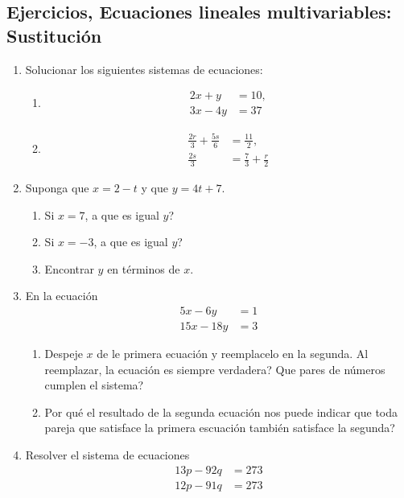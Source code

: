 \newpage
\begin{center}
	\vspace{-1cm}
	\subsection*{ Ejercicios, Ecuaciones lineales multivariables: Sustitución}\label{ejercicios:sustitucion}
\end{center}

\begin{enumerate}
	\item Solucionar los siguientes sistemas de ecuaciones:
	\begin{multicols}{2}
		\begin{enumerate}[label=\Alph*)]
			\item \begin{align*} 2x+y&=10, \\ 3x-4y &= 37\end{align*}
			\item \begin{align*} \frac{2r}{3}+\frac{5s}{6}&=\frac{11}{2}, \\ \frac{2s}{3}&= \frac{7}{3} + \frac{r}{2}\end{align*}
		\end{enumerate}
	\end{multicols}
	\item Suponga que $x=2-t$ y que $y = 4t+7$.
	\begin{enumerate}[label=\Alph*)]
		\item Si $x=7$, a que es igual $y$?
		\item Si $x=-3$, a que es igual $y$?
		\item Encontrar $y$ en términos de $x$.
	\end{enumerate}
	
	\item En la ecuación
	\begin{align*}
	5x -6y&=1\\
	15x - 18y &= 3
	\end{align*}
	\begin{enumerate}[label=\Alph*)]
		\item Despeje $x$ de le primera ecuación y reemplacelo en la segunda. Al reemplazar, la ecuación es siempre verdadera? Que pares de números cumplen el sistema?
		
		\item Por qué el resultado de la segunda ecuación nos puede indicar que toda pareja que satisface la primera escuación también satisface la segunda?				
	\end{enumerate}
	
	\item Resolver el sistema de ecuaciones 
	\begin{align*}
	13p -92q&=273\\
	12p - 91q &= 273
	\end{align*}
\end{enumerate}
\newpage


